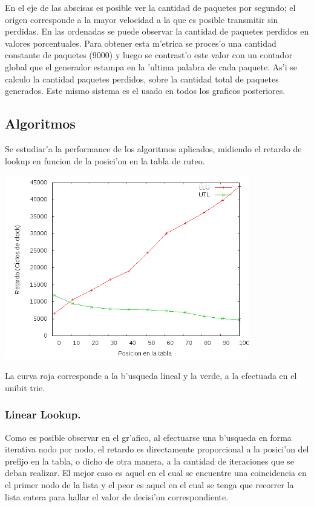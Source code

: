 \documentclass[12pt,spanish]{article}
\begin{document}
En el eje de las abscisas es posible ver la cantidad de paquetes por segundo; el origen corresponde a la mayor velocidad a la que es posible transmitir sin perdidas. En las ordenadas se puede observar la cantidad de paquetes perdidos en valores porcentuales. Para obtener esta m'etrica se proces'o una cantidad constante de paquetes (9000) y luego se contrast'o este valor con un contador global que el generador estampa en la 'ultima palabra de cada paquete. As'i se calculo la cantidad paquetes perdidos, sobre la cantidad total de paquetes generados. Este mismo sistema es el usado en todos los graficos posteriores.

\subsection{Algoritmos}

Se estudiar'a la performance de los algoritmos aplicados, midiendo el retardo de lookup en funcion de la posici'on en la tabla de ruteo.

\begin{center}
	\includegraphics[width=0.8\textwidth]{graf/llu-utlsof.png}
\end{center}

La curva roja corresponde a la b'usqueda lineal y la verde, a la efectuada en el unibit trie.

\subsubsection{Linear Lookup.}

Como es posible observar en el gr'afico, al efectuarse una b'usqueda en forma iterativa nodo por nodo, el retardo es directamente proporcional a la posici'on del prefijo en la tabla, o dicho de otra manera, a la cantidad de iteraciones que se deban realizar. El mejor caso es aquel en el cual se encuentre una coincidencia en el primer nodo de la lista y el peor es aquel en el cual se tenga que recorrer la lista entera para hallar el valor de decisi'on correspondiente.
\end{document}

